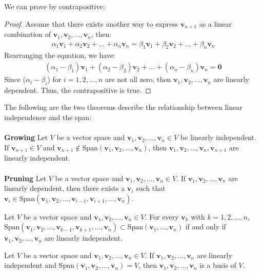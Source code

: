 \documentclass[11pt]{report}
\begin{document}
We can prove by contrapositive:
\begin{proof}
    Assume that there exists another way to express $\textbf{v}_{n+1}$ as a linear combination of $\textbf{v}_1, \textbf{v}_2, \ldots, \textbf{v}_n$, then:
    \begin{align*}
        \alpha_1 \textbf{v}_1 + \alpha_2 \textbf{v}_2 + \ldots + \alpha_n \textbf{v}_n = \beta_1 \textbf{v}_1 + \beta_2 \textbf{v}_2 + \ldots + \beta_n \textbf{v}_n
    \end{align*}
    Rearranging the equation, we have:
    \begin{align*}
        (\alpha_1 - \beta_1) \textbf{v}_1 + (\alpha_2 - \beta_2) \textbf{v}_2 + \ldots + (\alpha_n - \beta_n) \textbf{v}_n = \textbf{0}
    \end{align*}
    Since ($\alpha_i - \beta_i$) for $i = 1, 2, \ldots, n$ are not all zero, then $\textbf{v}_1, \textbf{v}_2, \ldots, \textbf{v}_n$ are linearly dependent. Thus, the contrapositive is true.
\end{proof}
\begin{theorem} The following are the two theorems describe the relationship between linear independence and the span: \\ \\
    \textbf{Growing} Let $V$ be a vector space and $\textbf{v}_1, \textbf{v}_2, \ldots, \textbf{v}_n \in V$ be linearly independent. If $\textbf{v}_{n+1} \in V$ and $\textbf{v}_{n+1} \notin \text{Span}(\textbf{v}_1, \textbf{v}_2, \ldots, \textbf{v}_n)$, then $\textbf{v}_1, \textbf{v}_2, \ldots, \textbf{v}_n, \textbf{v}_{n+1}$ are linearly independent. \\ \\
    \textbf{Pruning} Let $V$ be a vector space and $\textbf{v}_1, \textbf{v}_2, \ldots, \textbf{v}_n \in V$. If $\textbf{v}_1, \textbf{v}_2, \ldots, \textbf{v}_n$ are linearly dependent, then there exists a $\textbf{v}_i$ such that $\textbf{v}_i \in \text{Span}(\textbf{v}_1, \textbf{v}_2, \ldots, \textbf{v}_{i-1}, \textbf{v}_{i+1}, \ldots, \textbf{v}_n)$.
\end{theorem}
\begin{theorem}
    Let $V$ be a vector space and $\textbf{v}_1, \textbf{v}_2, \ldots, \textbf{v}_n \in V$. For every $\textbf{v}_k$ with $k = 1, 2, \ldots, n$, $\text{Span}(\textbf{v}_1, \textbf{v}_2, \ldots, \textbf{v}_{k-1}, \textbf{v}_{k+1}, \ldots, \textbf{v}_n) \subset \text{Span}(\textbf{v}_1, \ldots, \textbf{v}_n)$ if and only if $\textbf{v}_1, \textbf{v}_2, \ldots, \textbf{v}_n$ are linearly independent.
\end{theorem}
\begin{definition}[Basis]
    Let $V$ be a vector space and $\textbf{v}_1, \textbf{v}_2, \ldots, \textbf{v}_n \in V$. If $\textbf{v}_1, \textbf{v}_2, \ldots, \textbf{v}_n$ are linearly independent and $\text{Span}(\textbf{v}_1, \textbf{v}_2, \ldots, \textbf{v}_n) = V$, then $\textbf{v}_1, \textbf{v}_2, \ldots, \textbf{v}_n$ is a basis of $V$.
\end{definition}
\end{document}
